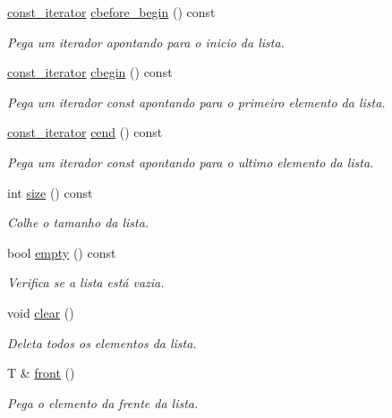 \begin{DoxyCompactItemize}
\hyperlink{class_forward__list_1_1const__iterator}{const\+\_\+iterator} \hyperlink{class_forward__list_af4521653f814b65d2d6553e10d68b004}{cbefore\+\_\+begin} () const 
\begin{DoxyCompactList}\small\item\em Pega um iterador apontando para o inicio da lista. \end{DoxyCompactList}\item 
\hyperlink{class_forward__list_1_1const__iterator}{const\+\_\+iterator} \hyperlink{class_forward__list_a9e4499538c8d69d746e7d09c085a6ced}{cbegin} () const 
\begin{DoxyCompactList}\small\item\em Pega um iterador const apontando para o primeiro elemento da lista. \end{DoxyCompactList}\item 
\hyperlink{class_forward__list_1_1const__iterator}{const\+\_\+iterator} \hyperlink{class_forward__list_aad341f8fad1e7aafb207434d8818f82a}{cend} () const 
\begin{DoxyCompactList}\small\item\em Pega um iterador const apontando para o ultimo elemento da lista. \end{DoxyCompactList}\item 
int \hyperlink{class_forward__list_a0773c719de2e80aa3185c85a42beea3b}{size} () const 
\begin{DoxyCompactList}\small\item\em Colhe o tamanho da lista. \end{DoxyCompactList}\item 
bool \hyperlink{class_forward__list_a765dc4c49b06c6debf4f34921e764a1f}{empty} () const 
\begin{DoxyCompactList}\small\item\em Verifica se a lista está vazia. \end{DoxyCompactList}\item 
void \hyperlink{class_forward__list_a7416894cdbf5076501c1008e65415a7e}{clear} ()
\begin{DoxyCompactList}\small\item\em Deleta todos os elementos da lista. \end{DoxyCompactList}\item 
T \& \hyperlink{class_forward__list_ade0b98cfad0e480195fb809f2e489409}{front} ()
\begin{DoxyCompactList}\small\item\em Pega o elemento da frente da lista. \end{DoxyCompactList}\item 

\end{DoxyCompactItemize}
